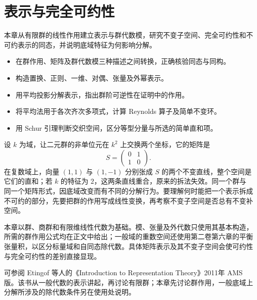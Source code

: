 

\chapter{表示与完全可约性}
\label{b5:ch:01}

\begin{chapterabstract}
	本章从有限群的线性作用建立表示与群代数模，研究不变子空间、完全可约性和不可约表示的同态，并说明底域特征为何影响分解。
\end{chapterabstract}

\begin{learninggoals}
	\begin{itemize}
		\item 在群作用、矩阵及群代数模三种描述之间转换，正确核验同态与同构。
		\item 构造置换、正则、一维、对偶、张量及外幂表示。
		\item 用平均投影分解表示，指出群阶可逆性在证明中的作用。
		\item 将平均法用于各次齐次多项式，计算 Reynolds 算子及简单不变环。
		\item 用 Schur 引理判断交织空间，区分等型分量与所选的简单直和项。
	\end{itemize}
\end{learninggoals}

设 \(k\) 为域，让二元群的非单位元在 \(k^2\) 上交换两个坐标，它的矩阵是
\[
	S=\begin{pmatrix}0&1\\1&0\end{pmatrix}.
\]
在复数域上，向量 \((1,1)\) 与 \((1,-1)\) 分别张成 \(S\) 的两个不变直线，整个空间是它们的直和；若 \(k\) 的特征为 \(2\)，这两条直线重合，原来的拆法失效。同一个群与同一个矩阵形式，因底域改变而有不同的分解行为。要理解何时能把一个表示拆成不可约的部分，先要把群的作用写成线性变换，再考察不变子空间是否总有不变补空间。

\ProseParagraphBreak
本章以群、商群和有限维线性代数为基础。模、张量及外代数只使用其基本构造，所需的群作用公式均在正文中给出；一般域的重数空间还使用第二卷第六章的平衡张量积，以区分标量域和自同态除代数。具体矩阵表示及其不变子空间会使可约性与完全可约性的差别直接显现。

\ProseParagraphBreak
可参阅 Etingof 等人的《Introduction to Representation Theory》2011年 AMS 版\cite[Proposition 2.3.9 and Corollary 2.3.10, pp. 11--12; Section 4.1, pp. 59--61]{EtingofEtAl2011RepresentationTheory}。该书从一般代数的表示讲起，再讨论有限群；本章先讨论群作用，一般底域上分解所涉及的除代数条件另在使用处说明。

